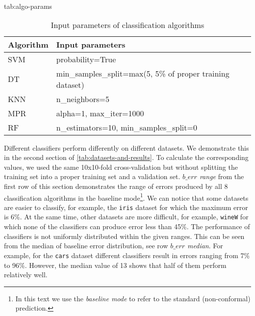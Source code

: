 \begin{table}[htbp]
\floatconts
  {tab:algo-params}%
  {\caption{Input parameters of classification algorithms}}%
  {
\begin{tabular}{l|l}
Algorithm & Input parameters                                               \\
\hline
SVM       & probability=True                                               \\
DT        & min\_samples\_split=max(5,  5\% of proper training dataset) \\
KNN       & n\_neighbors=5                                                 \\
MPR       & alpha=1, max\_iter=1000                                        \\
RF        & n\_estimators=10, min\_samples\_split=0                         
\end{tabular}
  }
\end{table}

Different classifiers perform differently on different datasets.
We demonstrate this in the second section of \cref{tab:datasets-and-results}.
To calculate the corresponding values, we used the same 10x10-fold cross-validation but without splitting the training set into a proper training set and a
validation set.
\textit{$b\_err$ range} from the first row of this section demonstrates the range of
errors produced by all 8 classification algorithms in the baseline mode\footnote{
In this text we use the \textit{baseline mode} to refer to the standard (non-conformal) prediction.
}. We can 
notice that some datasets are easier to classify, for example, the \verb|iris| dataset for which  the maximum error is 6\%. 
At the same time, other datasets are more difficult, for example, \verb|wineW| for which none of the classifiers can produce error less than 45\%.
The performance of classifiers is not uniformly distributed within the given ranges.
This can be seen from the median of baseline error distribution, see row \textit{$b\_err$ median}.
For example, for the  \verb|cars| dataset different classifiers result in errors ranging from 7\% to 96\%. However, the median value of 13 shows that half of them perform relatively well.


